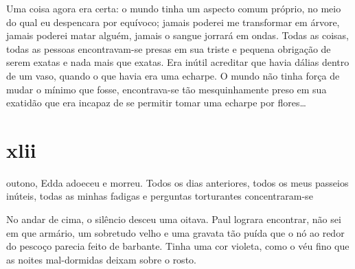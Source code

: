 Uma coisa agora era certa: o mundo tinha um aspecto comum próprio, no meio do
qual eu despencara por equívoco; jamais poderei me transformar em árvore,
jamais poderei matar alguém, jamais o sangue jorrará em ondas. Todas as
coisas, todas as pessoas encontravam-se presas em sua triste e pequena
obrigação de serem exatas e nada mais que exatas. Era inútil acreditar que
havia dálias dentro de um vaso, quando o que havia era uma echarpe. O mundo
não tinha força de mudar o mínimo que fosse, encontrava-se tão mesquinhamente
preso em sua exatidão que era incapaz de se permitir tomar uma echarpe por
flores\ldots{}


\section{xlii} 

 outono, Edda adoeceu e morreu. Todos os dias anteriores,
 todos os meus passeios inúteis, todas as minhas fadigas e perguntas
 torturantes concentraram-se 

No andar de cima, o silêncio desceu uma oitava. Paul lograra encontrar, não
sei em que armário, um sobretudo velho e uma gravata tão puída que o nó ao
redor do pescoço parecia feito de barbante. Tinha uma cor violeta, como o véu
fino que as noites mal-dormidas deixam sobre o rosto.




